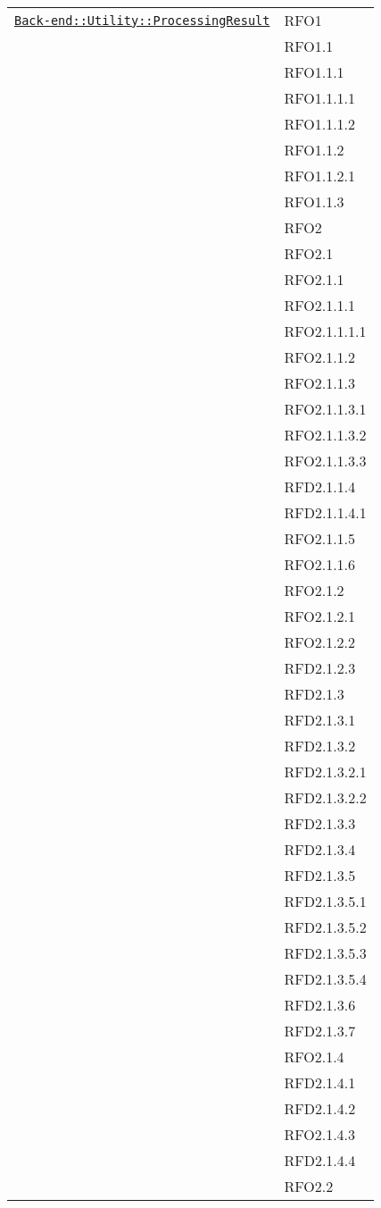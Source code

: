 \begin{longtable}{|>{\centering}m{10cm}|m{3cm}<{\centering}|}
\hyperref[Back-end::Utility::ProcessingResult]{\texttt{Back-end::Utility::ProcessingResult}} & RFO1\\
& RFO1.1\\
& RFO1.1.1\\
& RFO1.1.1.1\\
& RFO1.1.1.2\\
& RFO1.1.2\\
& RFO1.1.2.1\\
& RFO1.1.3\\
& RFO2\\
& RFO2.1\\
& RFO2.1.1\\
& RFO2.1.1.1\\
& RFO2.1.1.1.1\\
& RFO2.1.1.2\\
& RFO2.1.1.3\\
& RFO2.1.1.3.1\\
& RFO2.1.1.3.2\\
& RFO2.1.1.3.3\\
& RFD2.1.1.4\\
& RFD2.1.1.4.1\\
& RFO2.1.1.5\\
& RFO2.1.1.6\\
& RFO2.1.2\\
& RFO2.1.2.1\\
& RFO2.1.2.2\\
& RFD2.1.2.3\\
& RFD2.1.3\\
& RFD2.1.3.1\\
& RFD2.1.3.2\\
& RFD2.1.3.2.1\\
& RFD2.1.3.2.2\\
& RFD2.1.3.3\\
& RFD2.1.3.4\\
& RFD2.1.3.5\\
& RFD2.1.3.5.1\\
& RFD2.1.3.5.2\\
& RFD2.1.3.5.3\\
& RFD2.1.3.5.4\\
& RFD2.1.3.6\\
& RFD2.1.3.7\\
& RFO2.1.4\\
& RFD2.1.4.1\\
& RFD2.1.4.2\\
& RFO2.1.4.3\\
& RFD2.1.4.4\\
& RFO2.2\\

\end{longtable}
